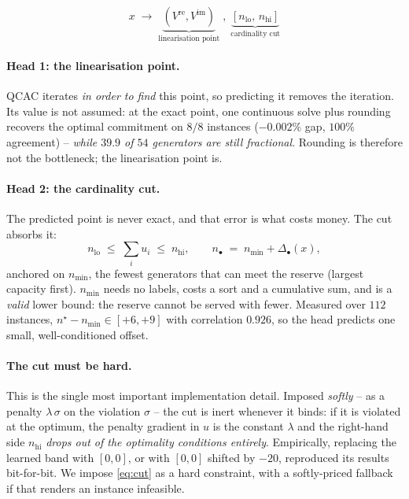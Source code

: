 \documentclass[11pt]{article}
\begin{document}
\begin{equation}
x \;\longrightarrow\;
\underbrace{(V^{\mathrm{re}},V^{\mathrm{im}})}_{\text{linearisation point}}
\;,\;
\underbrace{[n_{\mathrm{lo}},\,n_{\mathrm{hi}}]}_{\text{cardinality cut}}
\end{equation}

\paragraph{Head 1: the linearisation point.} QCAC iterates \emph{in order to
find} this point, so predicting it removes the iteration. Its value is not
assumed: at the exact point, one continuous solve plus rounding recovers the
optimal commitment on $8/8$ instances ($-0.002\%$ gap, $100\%$ agreement) --
\emph{while $39.9$ of $54$ generators are still fractional}. Rounding is
therefore not the bottleneck; the linearisation point is.

\paragraph{Head 2: the cardinality cut.} The predicted point is never exact, and
that error is what costs money. The cut absorbs it:
\begin{equation}
n_{\mathrm{lo}} \;\le\; \textstyle\sum_{i} u_i \;\le\; n_{\mathrm{hi}},
\qquad
n_{\bullet} \;=\; n_{\min} + \Delta_{\bullet}(x),
\label{eq:cut}
\end{equation}
anchored on $n_{\min}$, the fewest generators that can meet the reserve
(largest capacity first). $n_{\min}$ needs no labels, costs a sort and a
cumulative sum, and is a \emph{valid} lower bound: the reserve cannot be served
with fewer. Measured over $112$ instances, $n^\star - n_{\min}\in[+6,+9]$ with
correlation $0.926$, so the head predicts one small, well-conditioned offset.

\paragraph{The cut must be hard.} This is the single most important
implementation detail. Imposed \emph{softly} -- as a penalty $\lambda\,\sigma$ on
the violation $\sigma$ -- the cut is inert whenever it binds: if it is violated
at the optimum, the penalty gradient in $u$ is the constant $\lambda$ and the
right-hand side $n_{\mathrm{hi}}$ \emph{drops out of the optimality conditions
entirely}. Empirically, replacing the learned band with $[0,0]$, or with
$[0,0]$ shifted by $-20$, reproduced its results bit-for-bit. We impose
\eqref{eq:cut} as a hard constraint, with a softly-priced fallback if that
renders an instance infeasible.
\end{document}
